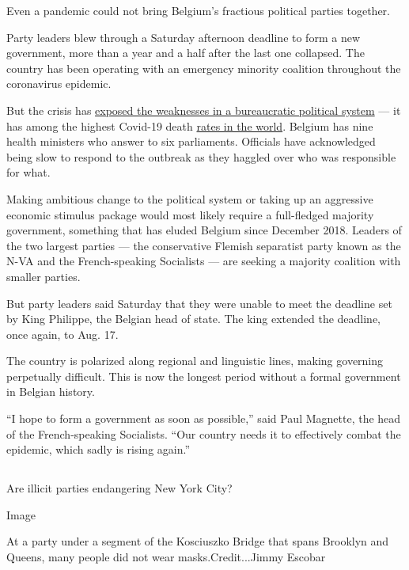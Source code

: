Even a pandemic could not bring Belgium's fractious political parties
together.

Party leaders blew through a Saturday afternoon deadline to form a new
government, more than a year and a half after the last one collapsed.
The country has been operating with an emergency minority coalition
throughout the coronavirus epidemic.

But the crisis has
\href{https://www.nytimes.com/2020/08/08/world/europe/coronavirus-nursing-homes-elderly.html}{exposed
the weaknesses in a bureaucratic political system} --- it has among the
highest Covid-19 death
\href{https://www.nytimes.com/interactive/2020/world/coronavirus-maps.html}{rates
in the world}. Belgium has nine health ministers who answer to six
parliaments. Officials have acknowledged being slow to respond to the
outbreak as they haggled over who was responsible for what.

Making ambitious change to the political system or taking up an
aggressive economic stimulus package would most likely require a
full-fledged majority government, something that has eluded Belgium
since December 2018. Leaders of the two largest parties --- the
conservative Flemish separatist party known as the N-VA and the
French-speaking Socialists --- are seeking a majority coalition with
smaller parties.

But party leaders said Saturday that they were unable to meet the
deadline set by King Philippe, the Belgian head of state. The king
extended the deadline, once again, to Aug. 17.

The country is polarized along regional and linguistic lines, making
governing perpetually difficult. This is now the longest period without
a formal government in Belgian history.

``I hope to form a government as soon as possible,'' said Paul Magnette,
the head of the French-speaking Socialists. ``Our country needs it to
effectively combat the epidemic, which sadly is rising again.''

\hypertarget{section-6}{%
\subsection{}\label{section-6}}

Are illicit parties endangering New York City?

Image

At a party under a segment of the Kosciuszko Bridge that spans Brooklyn
and Queens, many people did not wear masks.Credit...Jimmy Escobar

